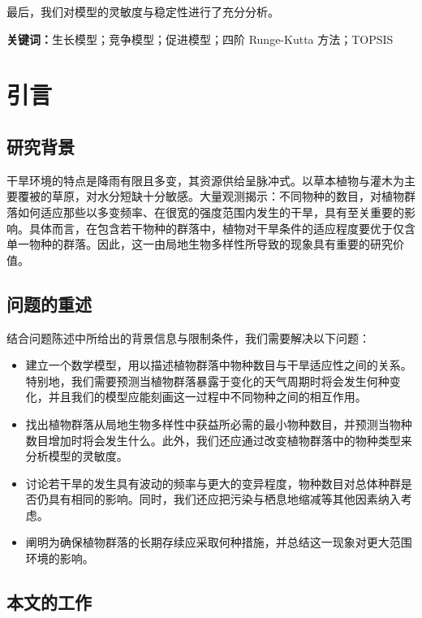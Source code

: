 \documentclass[11pt,a4paper]{ctexart}
\begin{document}
最后，我们对模型的灵敏度与稳定性进行了充分分析。

\vspace{6pt}
\noindent\textbf{关键词：}生长模型；竞争模型；促进模型；四阶 Runge-Kutta 方法；TOPSIS

\newpage
\pagestyle{fancy}

\section{引言}

\subsection{研究背景}

干旱环境的特点是降雨有限且多变，其资源供给呈脉冲式。以草本植物与灌木为主要覆被的草原，对水分短缺十分敏感。大量观测揭示：不同物种的数目，对植物群落如何适应那些以多变频率、在很宽的强度范围内发生的干旱，具有至关重要的影响。具体而言，在包含若干物种的群落中，植物对干旱条件的适应程度要优于仅含单一物种的群落。因此，这一由局地生物多样性所导致的现象具有重要的研究价值。

\subsection{问题的重述}

结合问题陈述中所给出的背景信息与限制条件，我们需要解决以下问题：

\begin{itemize}
\item 建立一个数学模型，用以描述植物群落中物种数目与干旱适应性之间的关系。特别地，我们需要预测当植物群落暴露于变化的天气周期时将会发生何种变化，并且我们的模型应能刻画这一过程中不同物种之间的相互作用。
\item 找出植物群落从局地生物多样性中获益所必需的最小物种数目，并预测当物种数目增加时将会发生什么。此外，我们还应通过改变植物群落中的物种类型来分析模型的灵敏度。
\item 讨论若干旱的发生具有波动的频率与更大的变异程度，物种数目对总体种群是否仍具有相同的影响。同时，我们还应把污染与栖息地缩减等其他因素纳入考虑。
\item 阐明为确保植物群落的长期存续应采取何种措施，并总结这一现象对更大范围环境的影响。
\end{itemize}

\subsection{本文的工作}
\end{document}
